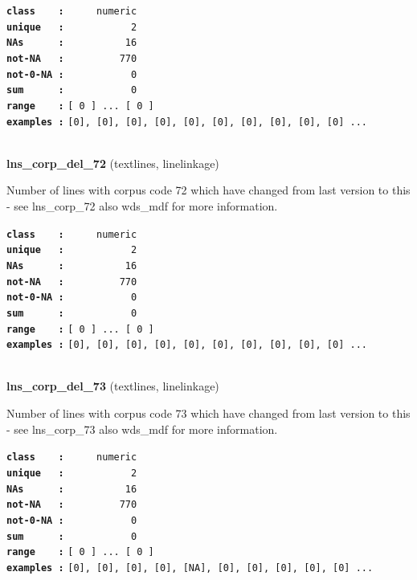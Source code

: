 \documentclass[]{article}
\begin{document}
\textbf{\texttt{class\ \ \ \ :}} \texttt{~~~~~numeric}\\
\textbf{\texttt{unique\ \ \ :}} \texttt{~~~~~~~~~~~2}\\
\textbf{\texttt{NAs\ \ \ \ \ \ :}} \texttt{~~~~~~~~~~16}\\
\textbf{\texttt{not-NA\ \ \ :}} \texttt{~~~~~~~~~770}\\
\textbf{\texttt{not-0-NA\ :}} \texttt{~~~~~~~~~~~0}\\
\textbf{\texttt{sum\ \ \ \ \ \ :}} \texttt{~~~~~~~~~~~0}\\
\textbf{\texttt{range\ \ \ \ :}}
\texttt{{[}\ 0\ {]}\ ...\ {[}\ 0\ {]}}\\
\textbf{\texttt{examples\ :}}
\texttt{{[}0{]},\ {[}0{]},\ {[}0{]},\ {[}0{]},\ {[}0{]},\ {[}0{]},\ {[}0{]},\ {[}0{]},\ {[}0{]},\ {[}0{]}\ ...}\\

~

\textbf{lns\_corp\_del\_72} (textlines, linelinkage)

Number of lines with corpus code 72 which have changed from last version
to this - see lns\_corp\_72 also wds\_mdf for more information.

\textbf{\texttt{class\ \ \ \ :}} \texttt{~~~~~numeric}\\
\textbf{\texttt{unique\ \ \ :}} \texttt{~~~~~~~~~~~2}\\
\textbf{\texttt{NAs\ \ \ \ \ \ :}} \texttt{~~~~~~~~~~16}\\
\textbf{\texttt{not-NA\ \ \ :}} \texttt{~~~~~~~~~770}\\
\textbf{\texttt{not-0-NA\ :}} \texttt{~~~~~~~~~~~0}\\
\textbf{\texttt{sum\ \ \ \ \ \ :}} \texttt{~~~~~~~~~~~0}\\
\textbf{\texttt{range\ \ \ \ :}}
\texttt{{[}\ 0\ {]}\ ...\ {[}\ 0\ {]}}\\
\textbf{\texttt{examples\ :}}
\texttt{{[}0{]},\ {[}0{]},\ {[}0{]},\ {[}0{]},\ {[}0{]},\ {[}0{]},\ {[}0{]},\ {[}0{]},\ {[}0{]},\ {[}0{]}\ ...}\\

~

\textbf{lns\_corp\_del\_73} (textlines, linelinkage)

Number of lines with corpus code 73 which have changed from last version
to this - see lns\_corp\_73 also wds\_mdf for more information.

\textbf{\texttt{class\ \ \ \ :}} \texttt{~~~~~numeric}\\
\textbf{\texttt{unique\ \ \ :}} \texttt{~~~~~~~~~~~2}\\
\textbf{\texttt{NAs\ \ \ \ \ \ :}} \texttt{~~~~~~~~~~16}\\
\textbf{\texttt{not-NA\ \ \ :}} \texttt{~~~~~~~~~770}\\
\textbf{\texttt{not-0-NA\ :}} \texttt{~~~~~~~~~~~0}\\
\textbf{\texttt{sum\ \ \ \ \ \ :}} \texttt{~~~~~~~~~~~0}\\
\textbf{\texttt{range\ \ \ \ :}}
\texttt{{[}\ 0\ {]}\ ...\ {[}\ 0\ {]}}\\
\textbf{\texttt{examples\ :}}
\texttt{{[}0{]},\ {[}0{]},\ {[}0{]},\ {[}0{]},\ {[}NA{]},\ {[}0{]},\ {[}0{]},\ {[}0{]},\ {[}0{]},\ {[}0{]}\ ...}\\
\end{document}
